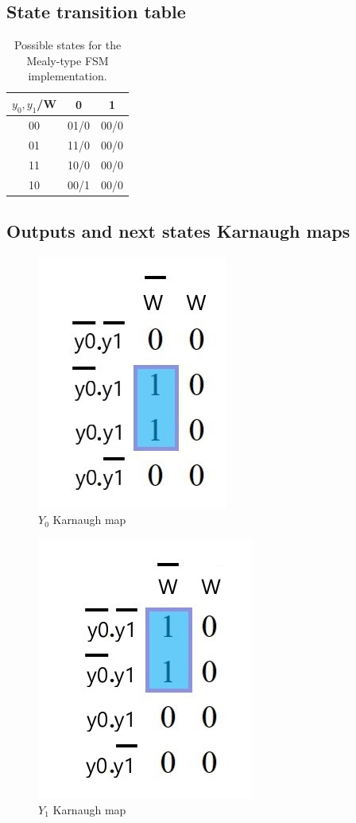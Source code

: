 \documentclass[../../e3_tp3_main.tex]{subfiles}
\begin{document}
\subsection{State transition table}

\begin{table}[H]	%
	\centering
		\begin{tabular}{|c|c|c|}
		\hline 
		$y_0,y_1$/W & 0 & 1 \\ 
		\hline 
		00 & 01/0 & 00/0 \\ 
		\hline 
		01 & 11/0 & 00/0 \\ 
		\hline 
		11 & 10/0 & 00/0 \\ 
		\hline 
		10 & 00/1 & 00/0 \\ 
		\hline 
		\end{tabular} 
	\caption{Possible states for the Mealy-type FSM implementation.}
	\label{tab:ej2_mealy_state_transitions}
\end{table}


\subsection{Outputs and next states Karnaugh maps}
\begin{figure}[H]
	\centering
	\includegraphics[scale=1]{figures/e3_tp3_ej2_mealy_y0_kmap.jpg}
	\caption{$Y_0$ Karnaugh map}
\end{figure}

\begin{figure}[H]
	\centering
	\includegraphics[scale=1]{figures/e3_tp3_ej2_mealy_y1_kmap.jpg}
	\caption{$Y_1$ Karnaugh map}
\end{figure}
\end{document}
